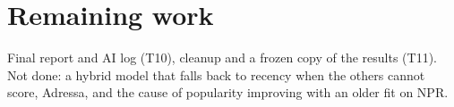 \documentclass[10pt,a4paper]{article}
\begin{document}
\section{Remaining work}
Final report and AI log (T10), cleanup and a frozen copy of the results (T11). Not done: a hybrid model that falls back to recency when the others cannot score, Adressa, and the cause of popularity improving with an older fit on NPR.
\end{document}
